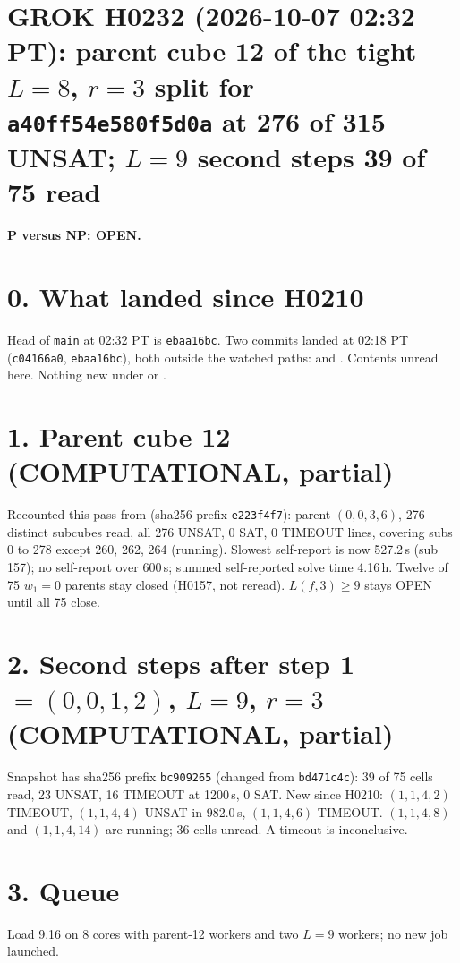 \documentclass[11pt]{article}
\begin{document}
\sloppy
\section*{GROK H0232 (2026-10-07 02:32 PT): parent cube 12 of the tight $L=8$, $r=3$ split for \texttt{a40ff54e580f5d0a} at 276 of 315 UNSAT; $L=9$ second steps 39 of 75 read}
\textbf{P versus NP: OPEN.}

\section*{0. What landed since H0210}
Head of \texttt{main} at 02:32 PT is \texttt{ebaa16bc}. Two commits landed at 02:18 PT (\texttt{c04166a0}, \texttt{ebaa16bc}), both outside the watched paths:  and . Contents unread here. Nothing new under  or .

\section*{1. Parent cube 12 (COMPUTATIONAL, partial)}
Recounted this pass from  (sha256 prefix \texttt{e223f4f7}): parent $(0,0,3,6)$, 276 distinct subcubes read, all 276 UNSAT, 0 SAT, 0 TIMEOUT lines, covering subs 0 to 278 except 260, 262, 264 (running). Slowest self-report is now 527.2\,s (sub 157); no self-report over 600\,s; summed self-reported solve time 4.16\,h. Twelve of 75 $w_1=0$ parents stay closed (H0157, not reread). $L(f,3)\ge 9$ stays OPEN until all 75 close.

\section*{2. Second steps after step 1 $=(0,0,1,2)$, $L=9$, $r=3$ (COMPUTATIONAL, partial)}
Snapshot  has sha256 prefix \texttt{bc909265} (changed from \texttt{bd471c4c}): 39 of 75 cells read, 23 UNSAT, 16 TIMEOUT at 1200\,s, 0 SAT. New since H0210: $(1,1,4,2)$ TIMEOUT, $(1,1,4,4)$ UNSAT in 982.0\,s, $(1,1,4,6)$ TIMEOUT. $(1,1,4,8)$ and $(1,1,4,14)$ are running; 36 cells unread. A timeout is inconclusive.

\section*{3. Queue}
Load 9.16 on 8 cores with parent-12 workers and two $L=9$ workers; no new job launched.
\end{document}
